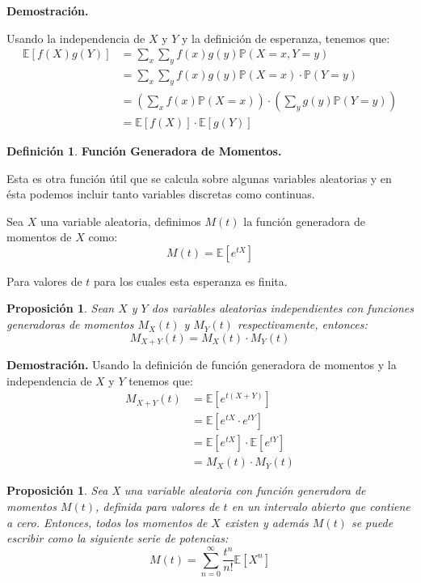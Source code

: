 \documentclass[
 12pt,
 letterpaper,
]{article}
\theoremstyle{teoremaBreak}
\theoremstyle{plain}
\newtheorem{proposicion}[teorema]{Proposición}
\theoremstyle{definition}
\newtheorem{definicion}[teorema]{Definición}
\begin{document}
\textbf{Demostración.}

Usando la independencia de $X$ y $Y$ y la definición de esperanza, tenemos que:
\begin{align*}
\mathbb{E}[f(X)g(Y)] &= \sum_{x} \sum_{y} f(x)g(y) \mathbb{P}(X = x, Y = y) \\
&= \sum_{x} \sum_{y} f(x)g(y) \mathbb{P}(X = x) \cdot \mathbb{P}(Y = y) \\
&= \left(\sum_{x} f(x) \mathbb{P}(X = x)\right) \cdot \left(\sum_{y} g(y) \mathbb{P}(Y = y)\right) \\
&= \mathbb{E}[f(X)] \cdot \mathbb{E}[g(Y)]
\end{align*}

\begin{definicion}
\textbf{Función Generadora de Momentos.}

Esta es otra función útil que se calcula sobre algunas variables aleatorias y en ésta podemos incluir 
tanto variables discretas como continuas.

Sea $X$ una variable aleatoria, definimos $M(t)$ la función generadora de momentos de $X$ como:
$$M(t) = \mathbb{E}[e^{tX}]$$

Para valores de $t$ para los cuales esta esperanza es finita.
\end{definicion}

\begin{proposicion}
Sean $X$ y $Y$ dos variables aleatorias independientes con funciones generadoras de momentos $M_X(t)$ y $M_Y(t)$ 
respectivamente, entonces:
$$M_{X + Y}(t) = M_X(t) \cdot M_Y(t)$$
\end{proposicion}

\textbf{Demostración.}
Usando la definición de función generadora de momentos y la independencia de $X$ y $Y$ tenemos que:
\begin{align*}
M_{X + Y}(t) &= \mathbb{E}[e^{t(X + Y)}] \\
&= \mathbb{E}[e^{tX} \cdot e^{tY}] \\
&= \mathbb{E}[e^{tX}] \cdot \mathbb{E}[e^{tY}] \\
&= M_X(t) \cdot M_Y(t)
\end{align*}




\begin{proposicion}
Sea X una variable aleatoria con función generadora de momentos $M(t)$, definida para valores de 
$t$ en un intervalo abierto que contiene a cero. Entonces, todos los momentos de $X$ existen y además 
$M(t)$ se puede escribir como la siguiente serie de potencias:
$$M(t) = \sum_{n=0}^{\infty} \dfrac{t^n}{n!} \mathbb{E}[X^n]$$
\end{proposicion}
\end{document}
